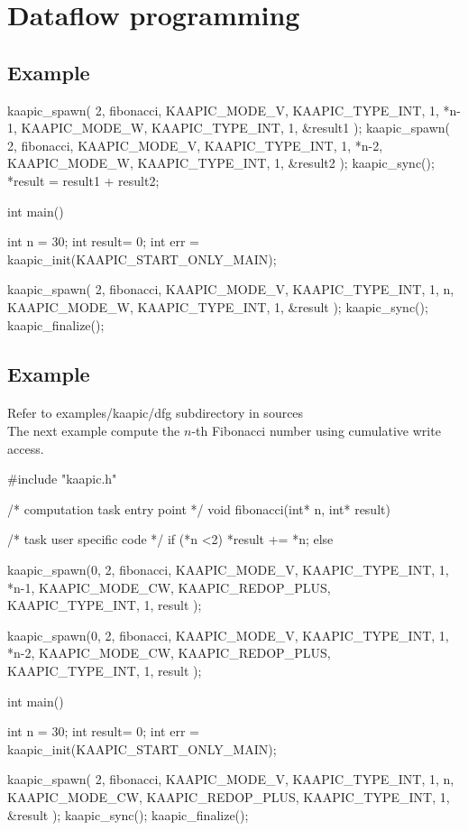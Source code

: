 \documentclass[a4paper, 11pt]{article}
\makeatletter
\newenvironment{apisection}[2][noshortnameprovided]{%
  \newpage
  \section{#2}
  \label{api@#1}
  \newcommand{\api@newpart}[4][noshortpartnameprovided]{%
    \newenvironment{##1}{%
      \subsection{##2}%
      \label{api@#1@##1}%
      ##3%
    }{##4}%
  }%
  \api@newpart[synopsis]{Synopsis}{}{}%
  \api@newpart[call]{Call}{}{}%
  \api@newpart[desc]{Description}{}{}%
  \api@newpart[params]{Parameters}{%
    \let\api@indesc\@empty
    \newcommand{\param}[1]{%
      \def\api@indesc{yes}%
      \begin{description}%
        \renewcommand{\param}[1]{\item[########1]}%
      \item[####1]
      }%
      \newenvironment{parameters}{%
        \begin{description}%
          \renewcommand{\param}[1]{\item[########1]}%
        }{%
        \end{description}%
      }
    }{%
      \ifx\api@indesc\@empty\relax\else%
    \end{description}%
    \fi%
  }%
  \api@newpart[ret]{Return value}{%
    \newcommand{\otherret}{\par\medskip\noindent}%
  }{}%
  \api@newpart[example]{Example}{}{}%
}{}
\makeatother
\begin{document}
\begin{apisection}[dataflow]{Dataflow programming}
\begin{example}
\begin{code}
{{        kaapic_spawn( 2, fibonacci, 
          KAAPIC_MODE_V, KAAPIC_TYPE_INT, 1, *n-1, 
          KAAPIC_MODE_W, KAAPIC_TYPE_INT, 1, &result1
        );
        kaapic_spawn( 2, fibonacci, 
          KAAPIC_MODE_V, KAAPIC_TYPE_INT, 1, *n-2,
          KAAPIC_MODE_W, KAAPIC_TYPE_INT, 1, &result2
        );
        kaapic_sync();
        *result = result1 + result2;
     }
  }

  int main()
  {
    int n = 30;
    int result= 0;
    int err = kaapic_init(KAAPIC_START_ONLY_MAIN);

    kaapic_spawn( 2, fibonacci, 
        KAAPIC_MODE_V, KAAPIC_TYPE_INT, 1, n,
        KAAPIC_MODE_W, KAAPIC_TYPE_INT, 1, &result
    );
    kaapic_sync();
    kaapic_finalize();
  }
    \end{code}
  \end{example}
\pagebreak

  \begin{example}\label{fibo_cw}
    \paragraph{}
    Refer to examples/kaapic/dfg subdirectory in sources\\
    
    The next example compute the $n$-th Fibonacci number using cumulative write access.
    \begin{code}
  #include "kaapic.h"

  /* computation task entry point */
  void fibonacci(int* n, int* result)
  {
    /* task user specific code */
    if (*n <2)
      *result += *n;
     else 
     {
        kaapic_spawn(0, 2, fibonacci, 
           KAAPIC_MODE_V, KAAPIC_TYPE_INT, 1, *n-1, 
           KAAPIC_MODE_CW, KAAPIC_REDOP_PLUS, 
                 KAAPIC_TYPE_INT, 1, result
        );
	
        kaapic_spawn(0, 2, fibonacci, 
          KAAPIC_MODE_V, KAAPIC_TYPE_INT, 1, *n-2,
          KAAPIC_MODE_CW, KAAPIC_REDOP_PLUS, 
                 KAAPIC_TYPE_INT, 1, result
        );
     }
  }

  int main()
  {
    int n = 30;
    int result= 0;
    int err = kaapic_init(KAAPIC_START_ONLY_MAIN);

    kaapic_spawn( 2, fibonacci, 
      KAAPIC_MODE_V, KAAPIC_TYPE_INT, 1, n,
      KAAPIC_MODE_CW, KAAPIC_REDOP_PLUS, 
            KAAPIC_TYPE_INT, 1, &result
    );
    kaapic_sync();
    kaapic_finalize();
  }
    \end{code}
  \end{example}
\pagebreak


\end{apisection}
\end{document}
